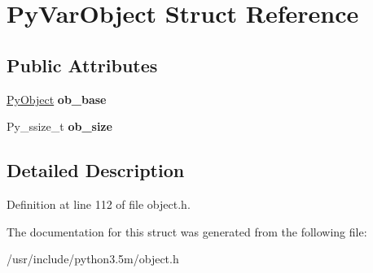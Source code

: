 \hypertarget{structPyVarObject}{}\section{Py\+Var\+Object Struct Reference}
\label{structPyVarObject}
\subsection*{Public Attributes}
\begin{DoxyCompactItemize}
\item 
\hyperlink{struct__object}{Py\+Object} {\bfseries ob\+\_\+base}\hypertarget{structPyVarObject_a8b688b12f411a48693a8b159da7ab549}{}\label{structPyVarObject_a8b688b12f411a48693a8b159da7ab549}

\item 
Py\+\_\+ssize\+\_\+t {\bfseries ob\+\_\+size}\hypertarget{structPyVarObject_ab0b102c17bbf84f5c55baaaff77847c9}{}\label{structPyVarObject_ab0b102c17bbf84f5c55baaaff77847c9}

\end{DoxyCompactItemize}


\subsection{Detailed Description}


Definition at line 112 of file object.\+h.



The documentation for this struct was generated from the following file\+:\begin{DoxyCompactItemize}
\item 
/usr/include/python3.\+5m/object.\+h\end{DoxyCompactItemize}
